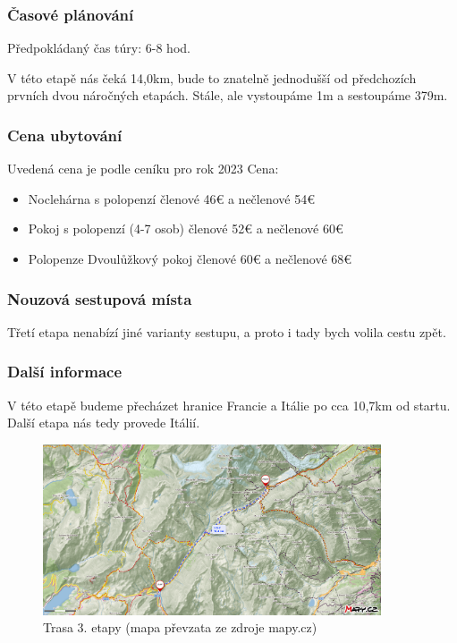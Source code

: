 \subsubsection*{Časové plánování}
\noindent Předpokládaný čas túry: 6-8 hod.

V této etapě nás čeká 14,0\:km, bude to znatelně jednodušší od předchozích prvních dvou náročných etapách. Stále, ale vystoupáme 1\:m a sestoupáme 379\:m.
\subsubsection*{Cena ubytování}
\noindent Uvedená cena je podle ceníku pro rok 2023
\noindent Cena:
\begin{itemize}
	\item Noclehárna s polopenzí členové 46\:€ a nečlenové 54\:€
	\item Pokoj s polopenzí (4-7 osob) členové 52\:€ a nečlenové 60\:€
	\item Polopenze Dvoulůžkový pokoj členové 60\:€ a nečlenové 68\:€
\end{itemize}
\subsubsection*{Nouzová sestupová místa}
Třetí etapa nenabízí jiné varianty sestupu, a proto i tady bych volila cestu zpět.
\subsubsection*{Další informace}
V této etapě budeme přecházet hranice Francie a Itálie po cca 10,7\:km od startu. Další etapa nás tedy provede Itálií. 
\begin{figure}[!hbt]
    \centering
    \includegraphics[width=10.0cm]{Figures/day_3.png}
    \caption[Trasa: den třetí]{Trasa 3. etapy (mapa převzata ze zdroje mapy.cz)}
    \label{Obr:day_3}
\end{figure} 
